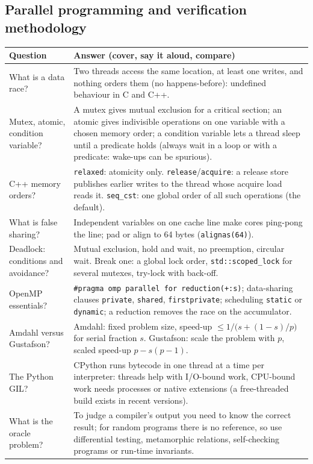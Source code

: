 \documentclass[10pt,a4paper,openany,oneside]{report}
\begin{document}
\subsection{Parallel programming and verification methodology}
\begin{center}\small
\begin{xltabular}{\textwidth}{@{}L{4.6cm}Y@{}}
\toprule
\textbf{Question} & \textbf{Answer (cover, say it aloud, compare)}\\
\midrule\endhead
What is a data race? & Two threads access the same location, at least one writes, and nothing orders them (no happens-before): undefined behaviour in C and C++.\\
Mutex, atomic, condition variable? & A mutex gives mutual exclusion for a critical section; an atomic gives indivisible operations on one variable with a chosen memory order; a condition variable lets a thread sleep until a predicate holds (always wait in a loop or with a predicate: wake-ups can be spurious).\\
C++ memory orders? & \texttt{relaxed}: atomicity only. \texttt{release}/\texttt{acquire}: a release store publishes earlier writes to the thread whose acquire load reads it. \texttt{seq\_cst}: one global order of all such operations (the default).\\
What is false sharing? & Independent variables on one cache line make cores ping-pong the line; pad or align to 64 bytes (\texttt{alignas(64)}).\\
Deadlock: conditions and avoidance? & Mutual exclusion, hold and wait, no preemption, circular wait. Break one: a global lock order, \texttt{std::scoped\_lock} for several mutexes, try-lock with back-off.\\
OpenMP essentials? & \texttt{\#pragma omp parallel for reduction(+:s)}; data-sharing clauses \texttt{private}, \texttt{shared}, \texttt{firstprivate}; scheduling \texttt{static} or \texttt{dynamic}; a reduction removes the race on the accumulator.\\
Amdahl versus Gustafson? & Amdahl: fixed problem size, speed-up $\le1/\big(s+(1-s)/p\big)$ for serial fraction $s$. Gustafson: scale the problem with $p$, scaled speed-up $p-s(p-1)$.\\
The Python GIL? & CPython runs bytecode in one thread at a time per interpreter: threads help with I/O-bound work, CPU-bound work needs processes or native extensions (a free-threaded build exists in recent versions).\\
What is the oracle problem? & To judge a compiler's output you need to know the correct result; for random programs there is no reference, so use differential testing, metamorphic relations, self-checking programs or run-time invariants.\\

\end{xltabular}
\end{center}
\end{document}
